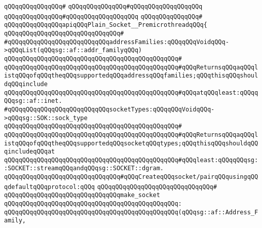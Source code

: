 \verb|qQQqqQQqqQQqqQQq#|\newline
\verb|qQQqqQQqqQQqqQQq#qQQqqQQqqQQqqQQqqQQq|\newline
\verb|qQQqqQQqqQQqqQQq#qQQqqQQqqQQqqQQqqQQq|\newline
\verb|qQQqqQQqqQQqqQQq#|\newline
\verb|qQQqqQQqqQQqqQQqapiqQQqPlain_Socket__PremicrothreadqQQq{|\newline
\verb|qQQqqQQqqQQqqQQqqQQqqQQqqQQqqQQq#|\newline
\verb|#qQQqqQQqqQQqqQQqqQQqqQQqqQQqaddressFamilies:qQQqqQQqVoidqQQq->qQQqList(qQQqsg::af::addr_familyqQQq)|\newline
\verb|qQQqqQQqqQQqqQQqqQQqqQQqqQQqqQQqqQQqqQQqqQQqqQQq#|\newline
\verb|qQQqqQQqqQQqqQQqqQQqqQQqqQQqqQQqqQQqqQQqqQQqqQQq#qQQqReturnsqQQqaqQQqlistqQQqofqQQqtheqQQqsupportedqQQqaddressqQQqfamilies;qQQqthisqQQqshouldqQQqinclude|\newline
\verb|qQQqqQQqqQQqqQQqqQQqqQQqqQQqqQQqqQQqqQQqqQQqqQQq#qQQqatqQQqleast:qQQqqQQqsg::af::inet.|\newline
\newline
\verb|#qQQqqQQqqQQqqQQqqQQqqQQqqQQqsocketTypes:qQQqqQQqVoidqQQq->qQQqsg::SOK::sock_type|\newline
\verb|qQQqqQQqqQQqqQQqqQQqqQQqqQQqqQQqqQQqqQQqqQQqqQQq#|\newline
\verb|qQQqqQQqqQQqqQQqqQQqqQQqqQQqqQQqqQQqqQQqqQQqqQQq#qQQqReturnsqQQqaqQQqlistqQQqofqQQqtheqQQqsupportedqQQqsocketqQQqtypes;qQQqthisqQQqshouldqQQqincludeqQQqat|\newline
\verb|qQQqqQQqqQQqqQQqqQQqqQQqqQQqqQQqqQQqqQQqqQQqqQQq#qQQqleast:qQQqqQQqsg::SOCKET::streamqQQqandqQQqsg::SOCKET::dgram.|\newline
\newline
\newline
\verb|qQQqqQQqqQQqqQQqqQQqqQQqqQQqqQQq#qQQqCreateqQQqsocket/pairqQQqusingqQQqdefaultqQQqprotocol:qQQq|\newline
\verb|qQQqqQQqqQQqqQQqqQQqqQQqqQQqqQQq#|\newline
\verb|qQQqqQQqqQQqqQQqqQQqqQQqqQQqqQQqmake_socket|\newline
\verb|qQQqqQQqqQQqqQQqqQQqqQQqqQQqqQQqqQQqqQQqqQQqqQQq:|\newline
\verb|qQQqqQQqqQQqqQQqqQQqqQQqqQQqqQQqqQQqqQQqqQQqqQQq(qQQqsg::af::Address_Family,|\newline

